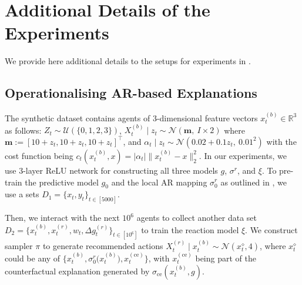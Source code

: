 


\section{Additional Details of the Experiments}\label{apx:detailed-exp}
We provide here additional details to the setups for experiments in .

\subsection{Operationalising AR-based Explanations}
The synthetic dataset contains agents of 3-dimensional feature vectors $x^{(b)}_t\in\mathbb{R}^3$ as follows: $Z_t \sim \mathcal{U}(\{0,1,2,3\})$, $X_t^{(b)}\mid z_t \sim \mathcal{N}(\mathbf{m},\ I\times 2)$ where $\mathbf{m}:=[10+z_t,10+z_t,10+z_t]^\top$, and $\alpha_t\mid z_t \sim \mathcal{N}(0.02+0.1z_t,\ 0.01^2)$ with the cost function being $c_t(x_t^{(b)},x)=|\alpha_t|\|x_t^{(b)}-x\|_2^2$.
In our experiments, we use 3-layer ReLU network for constructing all three models $g$, $\sigma^r$, and $\xi$. To pre-train the predictive model $g_0$ and the local AR mapping $\sigma^r_0$ as outlined in , we use a sets $D_1=\{x_t,y_t\}_{t\in[5000]}$.

Then, we interact with the next $10^6$ agents to collect another data set $D_2=\{x_t^{(b)}, x_t^{(r)}, w_t, \Delta g_t^{(r)}\}_{t\in[10^6]}$ to train the reaction model $\xi$. We construct sampler $\pi$ to generate recommended actions $X_t^{(r)}\mid x_t^{(b)} \sim \mathcal{N}(x_t^\diamond,4)$,
where $x_t^\diamond$ could be any of $\{x_t^{(b)},\sigma^r_0\big(x_t^{(b)}\big), x_t^{(\text{ce})}\}$, with $x_t^{(\text{ce})}$ being part of the counterfactual explanation generated by $\sigma_\text{ce}(x_t^{(b)},g)$.

